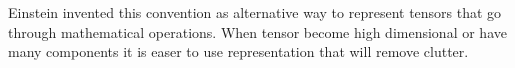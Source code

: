 \documentclass[../main.tex]{subfiles}
\begin{document}
	
	\par Einstein invented this convention as alternative way to represent tensors that go through mathematical operations. When tensor become high dimensional or have many components it is easer to use representation that will remove clutter. 
\end{document}
